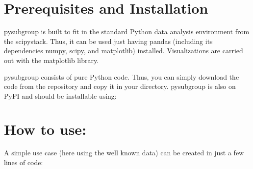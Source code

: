 \documentclass[letterpaper,10pt,english]{sphinxmanual}
\begin{document}
\section{Prerequisites and Installation}
\label{\detokenize{tutorials/introduction:Prerequisites-and-Installation}}
pysubgroup is built to fit in the standard Python data analysis environment from the scipy\sphinxhyphen{}stack. Thus, it can be used just having pandas (including its dependencies numpy, scipy, and matplotlib) installed. Visualizations are carried out with the matplotlib library.

pysubgroup consists of pure Python code. Thus, you can simply download the code from the repository and copy it in your  directory. pysubgroup is also on PyPI and should be installable using:

\begin{sphinxVerbatim}[commandchars=\\\{\}]
  
\end{sphinxVerbatim}


\section{How to use:}
\label{\detokenize{tutorials/introduction:How-to-use:}}
A simple use case (here using the well known  data) can be created in just a few lines of code:
\end{document}
